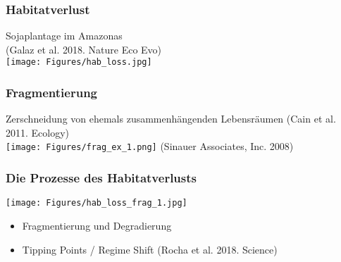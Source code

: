 \documentclass{beamer}
\begin{document}

\begin{frame}
\frametitle{Habitatverlust}
Sojaplantage im Amazonas\\(Galaz et al. 2018. Nature Eco Evo)\\
\vspace{0.3cm}
\texttt{[image: Figures/hab\_loss.jpg]}
\end{frame}


\begin{frame}
\frametitle{\LARGE\alert{Fragmentierung}}
Zerschneidung von ehemals zusammenhängenden Lebensräumen (Cain et al. 2011. Ecology)\\
\vspace{0.3cm}
\texttt{[image: Figures/frag\_ex\_1.png]}
\tiny (Sinauer Associates, Inc. 2008)
\end{frame}




\begin{frame}
\frametitle{\LARGE\alert{Die Prozesse des Habitatverlusts}}
\centering
\texttt{[image: Figures/hab\_loss\_frag\_1.jpg]}\\
\footnotesize
\begin{itemize}
\item Fragmentierung und Degradierung
\item Tipping Points / Regime Shift (Rocha et al. 2018. Science)
\end{itemize}
\end{frame}


\end{document}
